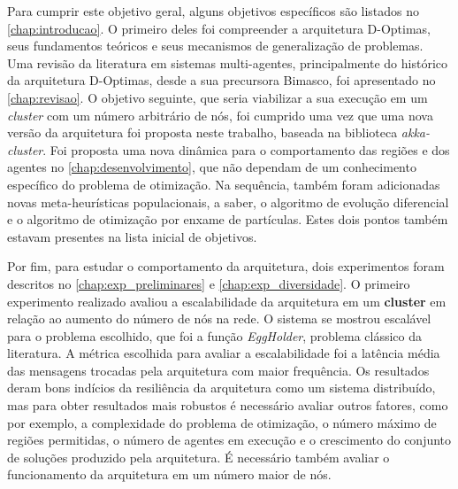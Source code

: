 Para cumprir este objetivo geral, alguns objetivos específicos são listados no \autoref{chap:introducao}. O primeiro deles foi compreender a arquitetura D-Optimas, seus fundamentos teóricos e seus mecanismos de generalização de problemas. Uma revisão da literatura em sistemas multi-agentes, principalmente do histórico da arquitetura D-Optimas, desde a sua precursora Bimasco, foi apresentado no \autoref{chap:revisao}. O objetivo seguinte, que seria viabilizar a sua execução em um \textit{cluster} com um número arbitrário de nós, foi cumprido uma vez que uma nova versão da arquitetura foi proposta neste trabalho, baseada na biblioteca \textit{akka-cluster}. Foi proposta uma nova dinâmica para o comportamento das regiões e dos agentes no \autoref{chap:desenvolvimento}, que não dependam de um conhecimento específico do problema de otimização. Na sequência, também foram adicionadas novas meta-heurísticas populacionais, a saber, o algoritmo de evolução diferencial e o algoritmo de otimização por enxame de partículas. Estes dois pontos também estavam presentes na lista inicial de objetivos. 

Por fim, para estudar o comportamento da arquitetura, dois experimentos foram descritos no \autoref{chap:exp_preliminares} e \autoref{chap:exp_diversidade}. O primeiro experimento realizado avaliou a escalabilidade da arquitetura em um \textbf{cluster} em relação ao aumento do número de nós na rede. O  sistema se mostrou escalável para o problema escolhido, que foi a função \textit{EggHolder}, problema clássico da literatura. A métrica escolhida para avaliar a escalabilidade foi a latência média das mensagens trocadas pela arquitetura com maior frequência. Os resultados deram bons indícios da resiliência da arquitetura como um sistema distribuído, mas para obter resultados mais robustos é necessário avaliar outros fatores, como por exemplo, a complexidade do problema de otimização, o número máximo de regiões permitidas, o número de agentes em execução e o crescimento do conjunto de soluções produzido pela arquitetura. É necessário também avaliar o funcionamento da arquitetura em um número maior de nós. 

